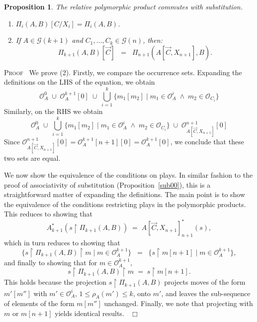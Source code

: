 \documentclass[a4paper,11pt]{article}
\newtheorem{proposition}{Proposition}[section]
\newcommand{\GG}[1]{\mathcal{G}(#1)}
\newcommand{\restrict}{{\upharpoonright}}
\newcommand{\Occ}{\mathcal{O}}
\newenvironment{proof}{\textsc{Proof}\ }{$\;\; \Box$}
\begin{document}
\begin{proposition}
\label{sub2}
The relative polymorphic product commutes with substitution.
\begin{enumerate}
\item $\Pi_{i}(A, B)[C/X_{i}] = \Pi_{i}(A, B)$.
\item If $A \in \GG{k+1}$ and $C_1 , \ldots , C_k \in \GG{n}$,  then:
\[ \Pi_{k+1}(A, B)[\vec{C}] \;\; = \;\; \Pi_{n+1}(A[\vec{C}, X_{n+1}], B) . \]
\end{enumerate}
\end{proposition}
\begin{proof}
We prove (2). Firstly, we compare the occurrence sets.
Expanding the definitions on the LHS of the equation, we obtain
\[ \Occ_A^0 \; \cup \; \Occ_A^{k+1}[0] \; \cup \; \bigcup_{i=1}^k \{ m_1[m_2] \mid m_1 \in \Occ_A^i \; \wedge \; m_2 \in \Occ_{C_i} \} \]
Similarly, on the RHS we obtain
\[ \Occ_A^0 \; \cup \; \bigcup_{i=1}^k \{ m_1[m_2] \mid m_1 \in \Occ_A^i \; \wedge \; m_2 \in \Occ_{C_i} \} \; \cup \; \Occ_{A[\vec{C},X_{n+1}]}^{n+1}[0] \]
Since $\Occ_{A[\vec{C},X_{n+1}]}^{n+1}[0] = \Occ_A^{k+1}[n+1][0] = \Occ_A^{k+1}[0]$, we conclude that these two sets are equal.

We now show the equivalence of the conditions on plays. In similar fashion to the proof of associativity of substitution (Proposition~\ref{sub00}), this is a straightforward matter of expanding the definitions. The main point is to show the equivalence of the conditions restricting plays in the polymorphic products. This reduces to showing that
\[ A^{\ast}_{k+1}(s \restrict \Pi_{k+1}(A, B)) \; = \; A[\vec{C}, X_{n+1}]^{\ast}_{n+1}(s) , \]
which in turn reduces to showing that
\[ \{ s \restrict \Pi_{k+1}(A, B)  \restrict m \mid m \in \Occ_A^{k+1} \} \;\; = \;\; \{ s \restrict m[n+1] \mid m \in \Occ_A^{k+1} \} , \]
and finally to showing that for $m \in \Occ_A^{k+1}$,
\[ s \restrict  \Pi_{k+1}(A, B) \restrict m \; = \; s \restrict m[n+1] . \]
This holds because the projection $s \restrict \Pi_{k+1}(A, B)$ projects moves of the form  $m'[m'']$ with $m' \in \Occ_A^i$,  $1 \leq \rho_{A}(m') \leq k$, onto $m'$, and leaves the sub-sequence of elements of the form $m[m'']$ unchanged.
Finally, we note that projecting  with $m$ or $m[n+1]$ yields identical results.
\end{proof}
\end{document}

